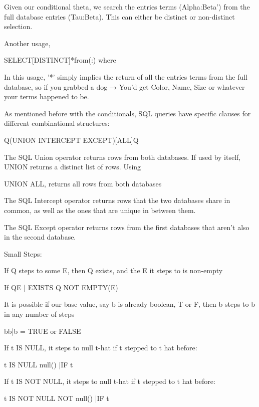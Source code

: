 \documentclass[12pt]{article}
\begin{document}
\item Given our conditional theta, we search the entries terms (Alpha:Beta') from the full database entries (Tau:Beta). This can either be distinct or non-distinct selection.
\item Another usage,
\item SELECT[DISTINCT]*from(\tau :\beta) where \;\Theta

\item In this usage, '*' simply implies the return of all the entries terms  from the full database, so if you grabbed a dog → You'd get Color, Name, Size or whatever your terms happened to be.

\item As mentioned before with the conditionals, SQL queries have specific clauses for different combinational structures:
\item Q(UNION \mid INTERCEPT \mid EXCEPT)[ALL]Q

\item The SQL Union operator returns rows from both databases. If used by itself, UNION returns a distinct list of rows. Using \item UNION ALL, returns all rows from both databases
\item The SQL Intercept operator returns rows that the two databases share in common, as well as the ones that are unique in between them.
\item The SQL Except operator returns rows from the first databases that aren't also in the second database.

\item Small Steps:

\item If Q steps to some E, then Q exists, and the E it steps to is non-empty
\item If \; QE \; | EXISTS \; Q  \; NOT \; EMPTY(E)


\item It is possible if our base value, say b is already boolean, T or F, then b steps to b in any number of steps
\item bb|b = TRUE \; or \; FALSE

\item If t IS NULL, it steps to null t-hat if t stepped to t hat before:
\item t \; IS \; NULL null() |IF \; t

\item If t IS NOT NULL, it steps to null t-hat if t stepped to t hat before:
\item t \; IS \; NOT \; NULL NOT \;null() |IF \; t
\end{document}
